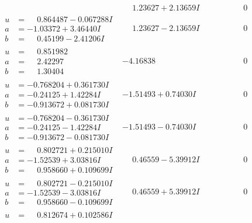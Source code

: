 \documentclass[1p]{elsarticle_modified}
\theoremstyle{definition}
\begin{document}
$$\begin{array}{c|c|c}
 & \phantom{-}1.23627 + 2.13659 I & \phantom{-0.000000 } 0 \\ \hline\begin{aligned}
u &= \phantom{-}0.864487 - 0.067288 I \\
a &= -1.03372 + 3.46440 I \\
b &= \phantom{-}0.45199 - 2.41206 I\end{aligned}
 & \phantom{-}1.23627 - 2.13659 I & \phantom{-0.000000 } 0 \\ \hline\begin{aligned}
u &= \phantom{-}0.851982\phantom{ +0.000000I} \\
a &= \phantom{-}2.42297\phantom{ +0.000000I} \\
b &= \phantom{-}1.30404\phantom{ +0.000000I}\end{aligned}
 & -4.16838\phantom{ +0.000000I} & \phantom{-0.000000 } 0 \\ \hline\begin{aligned}
u &= -0.768204 + 0.361730 I \\
a &= -0.24125 + 1.42284 I \\
b &= -0.913672 + 0.081730 I\end{aligned}
 & -1.51493 + 0.74030 I & \phantom{-0.000000 } 0 \\ \hline\begin{aligned}
u &= -0.768204 - 0.361730 I \\
a &= -0.24125 - 1.42284 I \\
b &= -0.913672 - 0.081730 I\end{aligned}
 & -1.51493 - 0.74030 I & \phantom{-0.000000 } 0 \\ \hline\begin{aligned}
u &= \phantom{-}0.802721 + 0.215010 I \\
a &= -1.52539 + 3.03816 I \\
b &= \phantom{-}0.958660 + 0.109699 I\end{aligned}
 & \phantom{-}0.46559 - 5.39912 I & \phantom{-0.000000 } 0 \\ \hline\begin{aligned}
u &= \phantom{-}0.802721 - 0.215010 I \\
a &= -1.52539 - 3.03816 I \\
b &= \phantom{-}0.958660 - 0.109699 I\end{aligned}
 & \phantom{-}0.46559 + 5.39912 I & \phantom{-0.000000 } 0 \\ \hline\begin{aligned}
u &= \phantom{-}0.812674 + 0.102586 I \\

\end{aligned}
\end{array}$$
\end{document}
